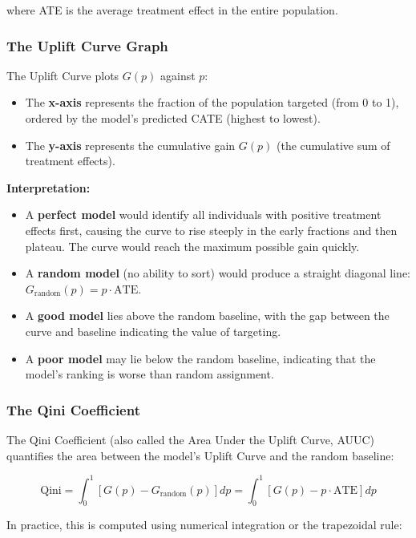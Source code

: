 \documentclass[12pt,a4paper]{article}
\begin{document}
where ATE is the average treatment effect in the entire population.

\subsubsection{The Uplift Curve Graph}

The Uplift Curve plots $G(p)$ against $p$:
\begin{itemize}
\item The \textbf{x-axis} represents the fraction of the population targeted (from 0 to 1), ordered by the model's predicted CATE (highest to lowest).
\item The \textbf{y-axis} represents the cumulative gain $G(p)$ (the cumulative sum of treatment effects).
\end{itemize}

\textbf{Interpretation:}
\begin{itemize}
\item A \textbf{perfect model} would identify all individuals with positive treatment effects first, causing the curve to rise steeply in the early fractions and then plateau. The curve would reach the maximum possible gain quickly.
\item A \textbf{random model} (no ability to sort) would produce a straight diagonal line: $G_{\text{random}}(p) = p \cdot \text{ATE}$.
\item A \textbf{good model} lies above the random baseline, with the gap between the curve and baseline indicating the value of targeting.
\item A \textbf{poor model} may lie below the random baseline, indicating that the model's ranking is worse than random assignment.
\end{itemize}

\subsubsection{The Qini Coefficient}

The Qini Coefficient (also called the Area Under the Uplift Curve, AUUC) quantifies the area between the model's Uplift Curve and the random baseline:

\begin{equation}
\text{Qini} = \int_0^1 \left[ G(p) - G_{\text{random}}(p) \right] dp = \int_0^1 \left[ G(p) - p \cdot \text{ATE} \right] dp
\end{equation}

In practice, this is computed using numerical integration or the trapezoidal rule:
\end{document}

